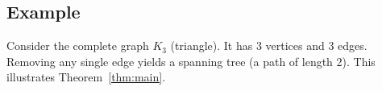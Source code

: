 \documentclass{article}
\begin{document}
\subsection{Example}
Consider the complete graph $K_3$ (triangle). It has 3 vertices and 3 edges.
Removing any single edge yields a spanning tree (a path of length 2).
This illustrates Theorem~\ref{thm:main}.

\end{document}
